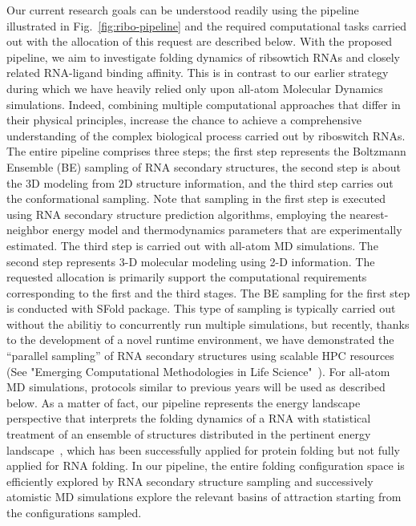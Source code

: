 \documentclass[a4paper,11pt]{article}
\begin{document}
Our current research goals can be understood readily using the pipeline illustrated in Fig.~\ref{fig:ribo-pipeline} and the required computational tasks carried out with the allocation of this request are described below. With the proposed pipeline, we aim to investigate folding dynamics of ribsowtich RNAs and closely related RNA-ligand binding affinity.  This is in contrast to our earlier strategy during which we have heavily relied only upon all-atom Molecular Dynamics simulations.  Indeed, combining multiple computational approaches that differ in their physical principles, increase the chance to achieve a comprehensive understanding of the complex biological process carried out by riboswitch RNAs.  The entire pipeline comprises three steps; the first step represents the Boltzmann Ensemble (BE) sampling of RNA secondary structures, the second step is about the 3D modeling from 2D structure information, and the third step carries out the conformational sampling.  Note that sampling in the first step is executed using RNA secondary structure prediction algorithms, employing the nearest-neighbor energy model and thermodynamics parameters that are experimentally estimated.  The third step is carried out with all-atom MD simulations. The second step represents 3-D molecular modeling using 2-D information.  The requested allocation is primarily support the computational requirements corresponding to the first and the third stages. The BE sampling for the first step is conducted with SFold package\cite{ding2006}.  This type of sampling is typically carried out without the abilitiy to concurrently run multiple simulations, but recently, thanks to the development of a novel runtime environment, we have demonstrated the ``parallel sampling'' of RNA secondary structures using scalable HPC resources (See "Emerging Computational Methodologies in Life Science"~\cite{ecmls10}). For all-atom MD simulations, protocols similar to previous years will be used as described below. As a matter of fact, our pipeline represents the energy landscape perspective that interprets the folding dynamics of a RNA with statistical treatment of an ensemble of structures distributed in the pertinent energy landscape~\cite{onuchic1997}, which has been successfully applied for protein folding but not fully applied for RNA folding\cite{cupal1997}. In our pipeline, the entire folding configuration space is efficiently explored by RNA secondary structure sampling and successively atomistic MD simulations explore the relevant basins of attraction starting from the configurations sampled.
\end{document}
